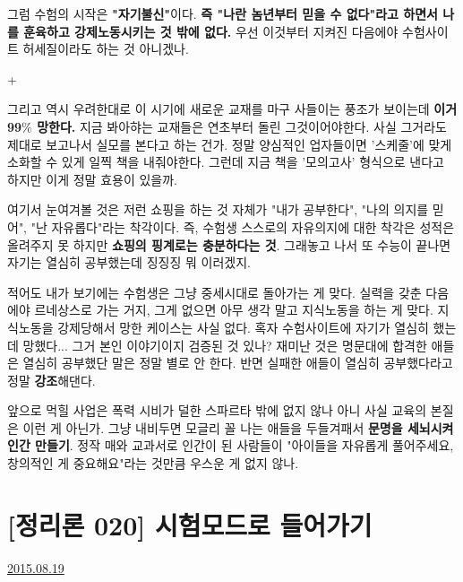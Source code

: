 그럼 수험의 시작은 \textbf{"자기불신"}이다.
\textbf{즉 "나란 놈년부터 믿을 수 없다"라고 하면서 나를 훈육하고 강제노동시키는 것 밖에 없다.}
우선 이것부터 지켜진 다음에야 수험사이트 허세질이라도 하는 것 아니겠나.
\vspace{5mm}

+
\vspace{5mm}

그리고 역시 우려한대로 이 시기에 새로운 교재를 마구 사들이는 풍조가 보이는데
\textbf{이거 99$\%$ 망한다.}
지금 봐아햐는 교재들은 연초부터 돌린 그것이어야한다. 사실 그거라도 제대로 보고나서 실모를 본다고 하는 건가.
정말 양심적인 업자들이면 '스케줄'에 맞게 소화할 수 있게 일찍 책을 내줘야한다.
그런데 지금 책을 '모의고사' 형식으로 낸다고 하지만 이게 정말 효용이 있을까.
\vspace{5mm}

여기서 눈여겨볼 것은 저런 쇼핑을 하는 것 자체가 "내가 공부한다", "나의 의지를 믿어", "난 자유롭다"라는 착각이다.
즉, 수험생 스스로의 자유의지에 대한 착각은 성적은 올려주지 못 하지만 \textbf{쇼핑의 핑계로는 충분하다는 것}.
그래놓고 나서 또 수능이 끝나면 자기는 열심히 공부했는데 징징징 뭐 이러겠지.
\vspace{5mm}

적어도 내가 보기에는 수험생은 그냥 중세시대로 돌아가는 게 맞다.
실력을 갖춘 다음에야 르네상스로 가는 거지, 그게 없으면 아무 생각 말고 지식노동을 하는 게 맞다.
지식노동을 강제당해서 망한 케이스는 사실 없다.
혹자 수험사이트에 자기가 열심히 했는데 망했다... 그거 본인 이야기이지 검증된 것 있나?
재미난 것은 명문대에 합격한 애들은 열심히 공부했단 말은 정말 별로 안 한다.
반면 실패한 애들이 열심히 공부했다라고 정말 \textbf{강조}해댄다.
\vspace{5mm}

앞으로 먹힐 사업은 폭력 시비가 덜한 스파르타 밖에 없지 않나
아니 사실 교육의 본질은 이런 게 아닌가. 그냥 내비두면 모글리 꼴 나는 애들을 두들겨패서 \textbf{문명을 세뇌시켜 인간 만들기}.
정작 매와 교과서로 인간이 된 사람들이 "아이들을 자유롭게 풀어주세요, 창의적인 게 중요해요"라는 것만큼 우스운 게 없지 않나.
\vspace{5mm}






\section{[정리론 020] 시험모드로 들어가기}
\href{https://www.kockoc.com/Apoc/261675}{2015.08.19}

\vspace{5mm}

